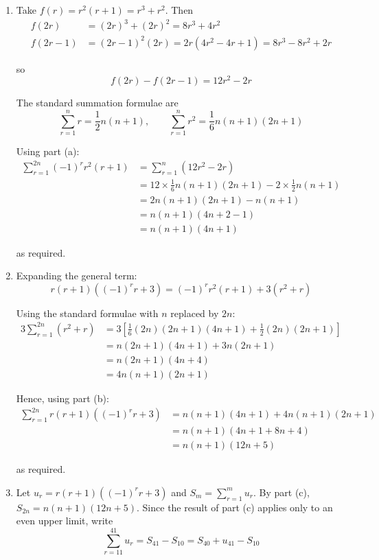 \documentclass[leqno]{article}
\begin{document}
\begin{enumerate}[
  label=\textbf{\arabic*.},
  leftmargin=*,
  topsep=0pt,
  partopsep=0pt,
  parsep=0pt
]
\begin{djsSolution}
\begin{enumerate}[label=\textbf{(\alph*)}, start=1]
Adding the contributions of all \(n\) pairs, and renaming the index \(k\) as \(r\), gives
\[
\sum_{r=1}^{2n}(-1)^r f(r)=\sum_{r=1}^{n}\left(f(2r)-f(2r-1)\right)
\]

  \item Take \(f(r)=r^2(r+1)=r^3+r^2\). Then
\begin{align*}
f(2r)&=(2r)^3+(2r)^2=8r^3+4r^2\\
f(2r-1)&=(2r-1)^2(2r)=2r\left(4r^2-4r+1\right)=8r^3-8r^2+2r
\end{align*}

so
\[
f(2r)-f(2r-1)=12r^2-2r
\]

The standard summation formulae are
\[
\sum_{r=1}^{n} r=\frac12 n(n+1),\qquad \sum_{r=1}^{n} r^2=\frac16 n(n+1)(2n+1)
\]

Using part (a):
\begin{align*}
\sum_{r=1}^{2n}(-1)^r r^2(r+1)&=\sum_{r=1}^{n}\left(12r^2-2r\right)\\
&=12\times\frac16 n(n+1)(2n+1)-2\times\frac12 n(n+1)\\
&=2n(n+1)(2n+1)-n(n+1)\\
&=n(n+1)\left(4n+2-1\right)\\
&=n(n+1)(4n+1)
\end{align*}

as required.

  \item Expanding the general term:
\[
r(r+1)\left((-1)^r r+3\right)=(-1)^r r^2(r+1)+3\left(r^2+r\right)
\]

Using the standard formulae with \(n\) replaced by \(2n\):
\begin{align*}
3\sum_{r=1}^{2n}\left(r^2+r\right)&=3\left[\frac16(2n)(2n+1)(4n+1)+\frac12(2n)(2n+1)\right]\\
&=n(2n+1)(4n+1)+3n(2n+1)\\
&=n(2n+1)(4n+4)\\
&=4n(n+1)(2n+1)
\end{align*}

Hence, using part (b):
\begin{align*}
\sum_{r=1}^{2n} r(r+1)\left((-1)^r r+3\right)&=n(n+1)(4n+1)+4n(n+1)(2n+1)\\
&=n(n+1)\left(4n+1+8n+4\right)\\
&=n(n+1)(12n+5)
\end{align*}

as required.

  \item Let \(u_r=r(r+1)\left((-1)^r r+3\right)\) and \(S_m=\sum_{r=1}^{m}u_r\). By part (c), \(S_{2n}=n(n+1)(12n+5)\). Since the result of part (c) applies only to an even upper limit, write
\[
\sum_{r=11}^{41}u_r=S_{41}-S_{10}=S_{40}+u_{41}-S_{10}
\]


\end{enumerate}
\end{djsSolution}
\end{enumerate}
\end{document}
